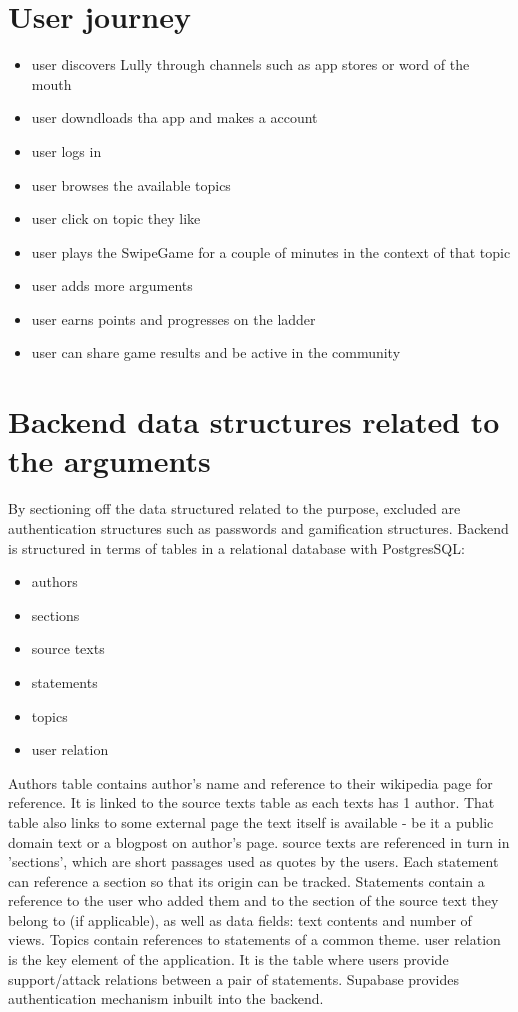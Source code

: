 \documentclass{report}
\begin{document}
\section{User journey}
\begin{itemize}
  \item user discovers Lully through channels such as app stores or word of the mouth
  \item user downdloads tha app and makes a account
  \item user logs in
  \item user browses the available topics
  \item user click on topic they like
  \item user plays the SwipeGame for a couple of minutes in the context of that topic
  \item user adds more arguments
  \item user earns points and progresses on the ladder
  \item user can share game results and be active in the community
\end{itemize}

\section{Backend data structures related to the arguments}
By sectioning off the data structured related to the purpose, excluded are authentication structures such as passwords and gamification structures.
Backend is structured in terms of tables in a relational database with PostgresSQL:
\begin{itemize}
  \item authors
  \item sections
  \item source texts
  \item statements
  \item topics
  \item user relation
\end{itemize}
Authors table contains author's name and reference to their wikipedia page for reference. It is linked to the source texts table as each texts has 1 author. That table also links to some external page the text itself is available - be it a public domain text or a blogpost on author's page. source texts are referenced in turn in 'sections', which are short passages used as quotes by the users.
Each statement can reference a section so that its origin can be tracked. Statements contain a reference to the user who added them and to the section of the source text they belong to (if applicable), as well as data fields: text contents and number of views. Topics contain references to statements of a common theme.
user relation is the key element of the application. It is the table where users provide support/attack relations between a pair of statements. 
Supabase provides authentication mechanism inbuilt into the backend.
\end{document}
